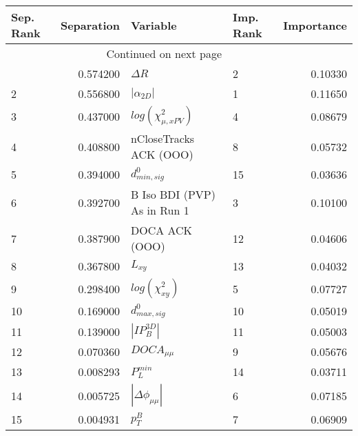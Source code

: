 \usepackage{lscape}

\begin{landscape}
\begin{longtable}{lrllr}
\toprule
Sep. Rank &  Separation &                     Variable & Imp. Rank &  Importance \\
\midrule
\endhead
\midrule
\multicolumn{3}{r}{{Continued on next page}} \\
\midrule
\endfoot

\bottomrule
\endlastfoot
        1 &    0.574200 &                   $\Delta R$ &         2 &     0.10330 \\
        2 &    0.556800 &              $|\alpha_{2D}|$ &         1 &     0.11650 \\
        3 &    0.437000 &    $log(\chi^{2}_{\mu,xPV})$ &         4 &     0.08679 \\
        4 &    0.408800 &       nCloseTracks ACK (OOO) &         8 &     0.05732 \\
        5 &    0.394000 &             $d^0_{min, sig}$ &        15 &     0.03636 \\
        6 &    0.392700 &  B Iso BDI (PVP) As in Run 1 &         3 &     0.10100 \\
        7 &    0.387900 &               DOCA ACK (OOO) &        12 &     0.04606 \\
        8 &    0.367800 &                     $L_{xy}$ &        13 &     0.04032 \\
        9 &    0.298400 &         $log(\chi^{2}_{xy})$ &         5 &     0.07727 \\
       10 &    0.169000 &             $d^0_{max, sig}$ &        10 &     0.05019 \\
       11 &    0.139000 &              $|IP_{B}^{3D}|$ &        11 &     0.05003 \\
       12 &    0.070360 &              $DOCA_{\mu\mu}$ &         9 &     0.05676 \\
       13 &    0.008293 &                $P^{min}_{L}$ &        14 &     0.03711 \\
       14 &    0.005725 &     $|\Delta \phi_{\mu\mu}|$ &         6 &     0.07185 \\
       15 &    0.004931 &                    $p^B_{T}$ &         7 &     0.06909 \\
\end{longtable}

\end{landscape}
